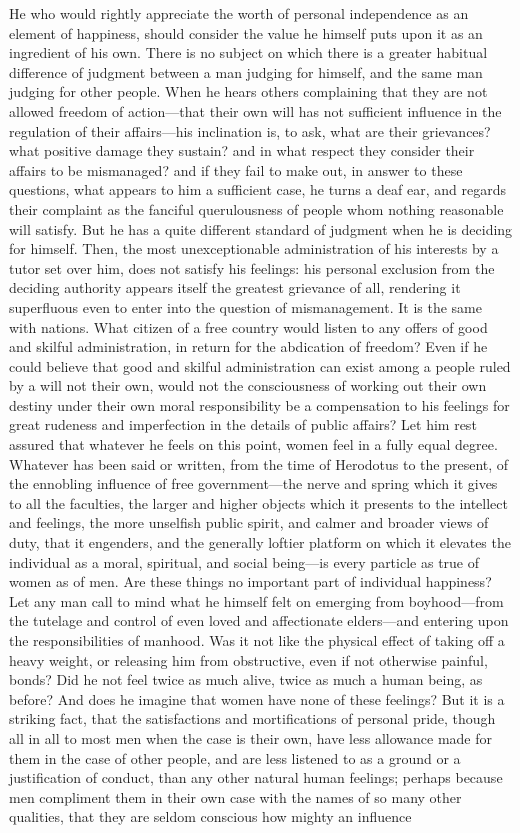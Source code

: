 \documentclass[12pt]{report}
\begin{document}
He who would rightly appreciate the worth of personal independence as an element of happiness, should consider the value he himself puts upon it as an ingredient of his own. There is no subject on which there is a greater habitual difference of judgment between a man judging for himself, and the same man judging for other people. When he hears others complaining that they are not allowed freedom of action—that their own will has not sufficient influence in the regulation of their affairs—his inclination is, to ask, what are their grievances? what positive damage they sustain? and in what respect they consider their affairs to be mismanaged? and if they fail to make out, in answer to these questions, what appears to him a sufficient case, he turns a deaf ear, and regards their complaint as the fanciful querulousness of people whom nothing reasonable will satisfy. But he has a quite different standard of judgment when he is deciding for himself. Then, the most unexceptionable administration of his interests by a tutor set over him, does not satisfy his feelings: his personal exclusion from the deciding authority appears itself the greatest grievance of all, rendering it superfluous even to enter into the question of mismanagement. It is the same with nations. What citizen of a free country would listen to any offers of good and skilful administration, in return for the abdication of freedom? Even if he could believe that good and skilful administration can exist among a people ruled by a will not their own, would not the consciousness of working out their own destiny under their own moral responsibility be a compensation to his feelings for great rudeness and imperfection in the details of public affairs? Let him rest assured that whatever he feels on this point, women feel in a fully equal degree. Whatever has been said or written, from the time of Herodotus to the present, of the ennobling influence of free government—the nerve and spring which it gives to all the faculties, the larger and higher objects which it presents to the intellect and feelings, the more unselfish public spirit, and calmer and broader views of duty, that it engenders, and the generally loftier platform on which it elevates the individual as a moral, spiritual, and social being—is every particle as true of women as of men. Are these things no important part of individual happiness? Let any man call to mind what he himself felt on emerging from boyhood—from the tutelage and control of even loved and affectionate elders—and entering upon the responsibilities of manhood. Was it not like the physical effect of taking off a heavy weight, or releasing him from obstructive, even if not otherwise painful, bonds? Did he not feel twice as much alive, twice as much a human being, as before? And does he imagine that women have none of these feelings? But it is a striking fact, that the satisfactions and mortifications of personal pride, though all in all to most men when the case is their own, have less allowance made for them in the case of other people, and are less listened to as a ground or a justification of conduct, than any other natural human feelings; perhaps because men compliment them in their own case with the names of so many other qualities, that they are seldom conscious how mighty an influence 
\end{document}
